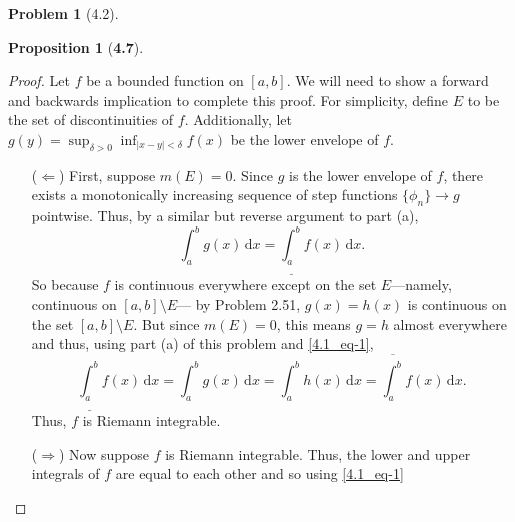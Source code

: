 \documentclass[12pt]{article}
\newcommand{\upint}[2]{
  \overline{\int_{#1}^{#2}}
}
\newcommand{\lowint}[2]{
  \underline{\int_{#1}^{#2}}
}
\newcommand{\dif}{\, \mathrm{d}}
\theoremstyle{definition}
\newtheorem{problem}{Problem}
\newtheorem*{prop}{Proposition}
\begin{document}
\begin{problem}[4.2]
\begin{enumerate}[label = (\alph{*})]
\begin{prop}[\textbf{4.7}]
                \begin{proof}
                    Let \( f \) be a bounded function on \( [a,b] \). We will need to show a forward and backwards implication to complete this proof. For simplicity, define \( E \) to be the set of discontinuities of \( f \). Additionally, let \( \displaystyle g(y) = \sup_{\delta > 0} \inf_{|x-y| < \delta} f(x) \) be the lower envelope of \( f \).

                        \begin{enumerate} 
                            \item[(\(\Leftarrow\))] First, suppose \( m(E) =  0 \). Since \( g \) is the lower envelope of \( f \), there exists a monotonically increasing sequence of step functions \( \{ \phi_n\} \to g \) pointwise. Thus, by a similar but reverse argument to part (a),
                            \begin{equation}
                                \label{4.1_eq-1}
                                \int_{a}^{b} g(x) \dif x = \lowint{a}{b} f(x) \dif x.  
                            \end{equation}
                            So because \( f \) is continuous everywhere except on the set \( E \)---namely, continuous on \( [a,b] \setminus E\)--- by Problem 2.51, \( g(x) = h(x) \) is continuous on the set \( [a,b] \setminus E \). But since \( m(E) = 0 \), this means \( g = h \) almost everywhere and thus, using part (a) of this problem and \cref{4.1_eq-1}, 
                                \[
                                    \lowint{a}{b} f(x) \dif x = \int_{a}^{b} g(x) \dif x = \int_{a}^{b} h(x) \dif x = \upint{a}{b} f(x) \dif x.
                                \]
                            Thus, \( f \) is Riemann integrable. 
                            \item[(\(\Rightarrow\))] Now suppose \( f \) is Riemann integrable. Thus, the lower and upper integrals of \( f \) are equal to each other and so using \cref{4.1_eq-1}
        

\end{enumerate}
\end{proof}
\end{prop}
\end{enumerate}
\end{problem}
\end{document}
